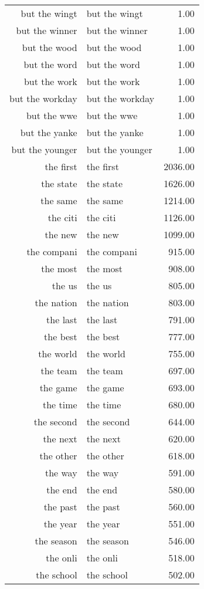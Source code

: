 \begin{table}[ht]
\begin{tabular}{rlr}
  but the wingt & but the wingt & 1.00 \\ 
  but the winner & but the winner & 1.00 \\ 
  but the wood & but the wood & 1.00 \\ 
  but the word & but the word & 1.00 \\ 
  but the work & but the work & 1.00 \\ 
  but the workday & but the workday & 1.00 \\ 
  but the wwe & but the wwe & 1.00 \\ 
  but the yanke & but the yanke & 1.00 \\ 
  but the younger & but the younger & 1.00 \\ 
  the first & the first & 2036.00 \\ 
  the state & the state & 1626.00 \\ 
  the same & the same & 1214.00 \\ 
  the citi & the citi & 1126.00 \\ 
  the new & the new & 1099.00 \\ 
  the compani & the compani & 915.00 \\ 
  the most & the most & 908.00 \\ 
  the us & the us & 805.00 \\ 
  the nation & the nation & 803.00 \\ 
  the last & the last & 791.00 \\ 
  the best & the best & 777.00 \\ 
  the world & the world & 755.00 \\ 
  the team & the team & 697.00 \\ 
  the game & the game & 693.00 \\ 
  the time & the time & 680.00 \\ 
  the second & the second & 644.00 \\ 
  the next & the next & 620.00 \\ 
  the other & the other & 618.00 \\ 
  the way & the way & 591.00 \\ 
  the end & the end & 580.00 \\ 
  the past & the past & 560.00 \\ 
  the year & the year & 551.00 \\ 
  the season & the season & 546.00 \\ 
  the onli & the onli & 518.00 \\ 
  the school & the school & 502.00 \\ 

\end{tabular}
\end{table}
